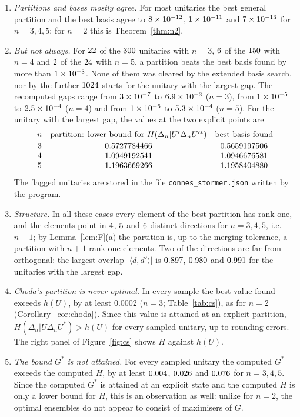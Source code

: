 \documentclass[11pt]{article}
\theoremstyle{plain}
\theoremstyle{definition}
\theoremstyle{remark}
\begin{document}
\begin{enumerate}
\item[(i)] \emph{Partitions and bases mostly agree.} For most unitaries the best general partition and the best basis agree to
$8\times10^{-12}$, $1\times10^{-11}$ and $7\times10^{-13}$ for $n=3,4,5$; for $n=2$ this is Theorem~\ref{thm:n2}.
\item[(ii)] \emph{But not always.} For $22$ of the $300$ unitaries with $n=3$, $6$ of the
$150$ with $n=4$ and $2$ of the $24$ with $n=5$, a partition beats the best basis found by more than
$1\times10^{-8}$. None of them was cleared by the extended basis search, nor by the further $1024$ starts for the unitary
with the largest gap. The recomputed gaps range from $3\times10^{-7}$ to $6.9\times10^{-3}$ ($n=3$), from $1\times10^{-5}$ to
$2.5\times10^{-4}$ ($n=4$) and from $1\times10^{-6}$ to $5.3\times10^{-4}$ ($n=5$). For the unitary with the largest gap, the values at the two explicit
points are
\[
  \begin{array}{ccc}
  n & \text{partition: lower bound for }H(\Delta_n|U'\Delta_nU'^*) & \text{best basis found}\\[2pt]
  3 & 0.5727784466 & 0.5659197506\\
  4 & 1.0949192541 & 1.0946676581\\
  5 & 1.1963669266 & 1.1958404880
  \end{array}
\]
The flagged unitaries are stored in the file
\texttt{connes\_\allowbreak stormer.json} written by the program.
\item[(iii)] \emph{Structure.} In all these cases every element of the best partition has rank one, and the elements point in
$4$, $5$ and $6$ distinct directions for $n=3,4,5$, i.e.\ $n+1$; by Lemma~\ref{lem:F}(a) the
partition is, up to the merging tolerance, a partition with $n+1$ rank-one elements. Two of the directions are far from
orthogonal: the largest overlap $|\langle d,d'\rangle|$ is $0.897$, $0.980$ and $0.991$ for the
unitaries with the largest gap.
\item[(iv)] \emph{Choda's partition is never optimal.} In every sample the best value found exceeds $h(U)$, by at least
$0.0002$ ($n=3$; Table~\ref{tab:cs}), as for $n=2$ (Corollary~\ref{cor:choda}). Since this value is attained at an explicit
partition, $H(\Delta_n|U\Delta_nU^*)>h(U)$ for every sampled unitary, up to rounding errors. The right panel of
Figure~\ref{fig:cs} shows $H$ against $h(U)$.
\item[(v)] \emph{The bound $G^*$ is not attained.} For every sampled unitary the computed $G^*$ exceeds the computed $H$, by at
least $0.004$, $0.026$ and $0.076$ for $n=3,4,5$. Since the computed $G^*$ is attained at an
explicit state and the computed $H$ is only a lower bound for $H$, this is an observation as well: unlike for $n=2$, the optimal
ensembles do not appear to consist of maximisers of $G$.
\end{enumerate}
\end{document}
